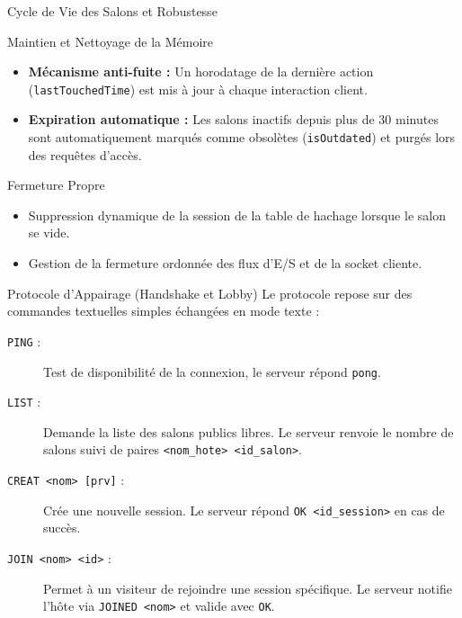 \documentclass{beamer}
\begin{document}
\begin{frame}{Cycle de Vie des Salons et Robustesse}
    \begin{block}{Maintien et Nettoyage de la Mémoire}
        \begin{itemize}
            \item \textbf{Mécanisme anti-fuite :} Un horodatage de la dernière action (\texttt{lastTouchedTime}) est mis à jour à chaque interaction client.
            \item \textbf{Expiration automatique :} Les salons inactifs depuis plus de 30 minutes sont automatiquement marqués comme obsolètes (\texttt{isOutdated}) et purgés lors des requêtes d'accès.
        \end{itemize}
    \end{block}
    \begin{block}{Fermeture Propre}
        \begin{itemize}
            \item Suppression dynamique de la session de la table de hachage lorsque le salon se vide.
            \item Gestion de la fermeture ordonnée des flux d'E/S et de la socket cliente.
        \end{itemize}
    \end{block}
\end{frame}

\begin{frame}{Protocole d'Appairage (Handshake et Lobby)}
    Le protocole repose sur des commandes textuelles simples échangées en mode texte :
    \begin{description}
        \item[\texttt{PING} :] Test de disponibilité de la connexion, le serveur répond \texttt{pong}.
        \item[\texttt{LIST} :] Demande la liste des salons publics libres. Le serveur renvoie le nombre de salons suivi de paires \texttt{<nom\_hote> <id\_salon>}.
        \item[\texttt{CREAT <nom> [prv]} :] Crée une nouvelle session. Le serveur répond \texttt{OK <id\_session>} en cas de succès.
        \item[\texttt{JOIN <nom> <id>} :] Permet à un visiteur de rejoindre une session spécifique. Le serveur notifie l'hôte via \texttt{JOINED <nom>} et valide avec \texttt{OK}.
    \end{description}
\end{frame}
\end{document}
